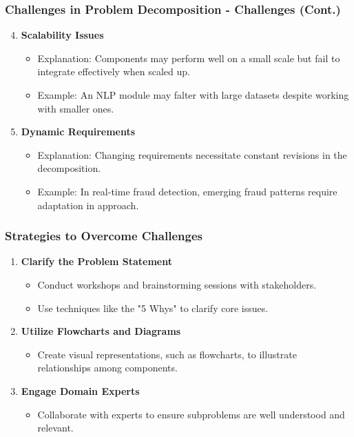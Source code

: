 \documentclass[aspectratio=169]{beamer}
\begin{document}
\begin{frame}[fragile]
    \frametitle{Challenges in Problem Decomposition - Challenges (Cont.)}
    \begin{enumerate}
        \setcounter{enumi}{3}
        \item \textbf{Scalability Issues}
            \begin{itemize}
                \item Explanation: Components may perform well on a small scale but fail to integrate effectively when scaled up. 
                \item Example: An NLP module may falter with large datasets despite working with smaller ones.
            \end{itemize}
        
        \item \textbf{Dynamic Requirements}
            \begin{itemize}
                \item Explanation: Changing requirements necessitate constant revisions in the decomposition.
                \item Example: In real-time fraud detection, emerging fraud patterns require adaptation in approach.
            \end{itemize}
    \end{enumerate}
\end{frame}

\begin{frame}[fragile]
    \frametitle{Strategies to Overcome Challenges}
    \begin{enumerate}
        \item \textbf{Clarify the Problem Statement}
            \begin{itemize}
                \item Conduct workshops and brainstorming sessions with stakeholders. 
                \item Use techniques like the "5 Whys" to clarify core issues.
            \end{itemize}
        
        \item \textbf{Utilize Flowcharts and Diagrams}
            \begin{itemize}
                \item Create visual representations, such as flowcharts, to illustrate relationships among components.
            \end{itemize}
        
        \item \textbf{Engage Domain Experts}
            \begin{itemize}
                \item Collaborate with experts to ensure subproblems are well understood and relevant.
            \end{itemize}
    \end{enumerate}
\end{frame}
\end{document}
